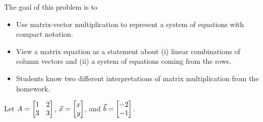 \documentclass{problemset}
\begin{document}
	\question
	\begin{annotation}
		\begin{goals}

			The goal of this problem is to
			\begin{itemize}
				\item Use matrix-vector multiplication to represent a system of equations
					with compact notation.
				\item View a matrix equation as a statement about (i) linear combinations of column vectors
					and (ii) a system of equations coming from the rows.
			\end{itemize}
		\end{goals}

		\begin{notes}
			\begin{itemize}
				\item Students know two different interpretations of matrix multiplication from
					the homework.
			\end{itemize}
		\end{notes}
	\end{annotation}
	Let $A=\mat{1&2\\3&3}$, $\vec x=\mat{x\\y}$, and $\vec b=\mat{-2\\-1}$.
\end{document}
